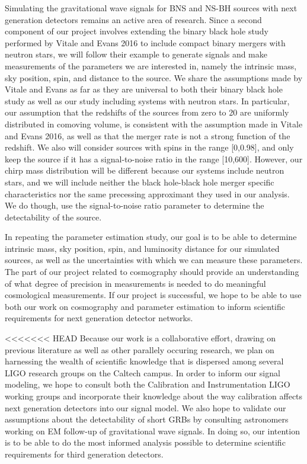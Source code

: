 \documentclass{article}
\begin{document}
Simulating the gravitational wave signals for BNS and NS-BH sources with next generation detectors remains an active area of research.  Since a second component of our project involves extending the binary black hole study performed by Vitale and Evans 2016 to include compact binary mergers with neutron stars, we will follow their example to generate signals and make measurements of the parameters we are interested in, namely the intrinsic mass, sky position, spin, and distance to the source.  We share the assumptions made by Vitale and Evans as far as they are universal to both their binary black hole study as well as our study including systems with neutron stars.  In particular, our assumption that the redshifts of the sources from zero to 20 are uniformly distributed in comoving volume, is consistent with the assumption made in Vitale and Evans 2016, as well as that the merger rate is not a strong function of the redshift.  We also will consider sources with spins in the range [0,0.98], and only keep the source if it has a signal-to-noise ratio in the range [10,600].  However, our chirp mass distribution will be different because our systems include neutron stars, and we will include neither the black hole-black hole merger specific characteristics nor the same precessing approximant they used in our analysis.  We do though, use the signal-to-noise ratio parameter to determine the detectability of the source.

In repeating the parameter estimation study, our goal is to be able to determine intrinsic mass, sky position, spin, and luminosity distance for our simulated sources, as well as the uncertainties with which we can measure these parameters.  The part of our project related to cosmography should provide an understanding of what degree of precision in measurements is needed to do meaningful cosmological measurements.  If our project is successful, we hope to be able to use both our work on cosmography and parameter estimation to inform scientific requirements for next generation detector networks.

<<<<<<< HEAD
Because our work is a collaborative effort, drawing on previous literature as well as other parallely occuring research, we plan on harnessing the wealth of scientific knowledge that is dispersed among several LIGO research groups on the Caltech campus.  In order to inform our signal modeling, we hope to consult both the Calibration and Instrumentation LIGO working  groups and incorporate their knowledge about the way calibration affects next generation detectors into our signal model.  We also hope to validate our assumptions about the detectability of short GRBs by consulting astronomers working on EM follow-up of gravitational wave signals.  In doing so, our intention is to be able to do the most informed analysis possible to determine scientific requirements for third generation detectors.
\end{document}

